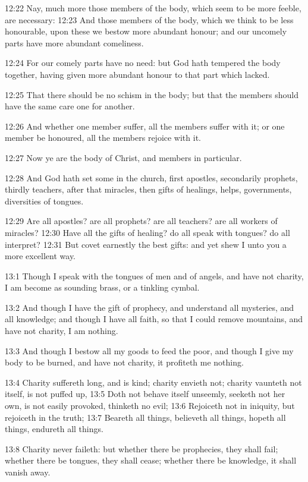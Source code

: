 12:22 Nay, much more those members of the body, which seem to be more feeble, are necessary: 12:23 And those members of the body, which we think to be less honourable, upon these we bestow more abundant honour; and our uncomely parts have more abundant comeliness.

12:24 For our comely parts have no need: but God hath tempered the body together, having given more abundant honour to that part which lacked.

12:25 That there should be no schism in the body; but that the members should have the same care one for another.

12:26 And whether one member suffer, all the members suffer with it; or one member be honoured, all the members rejoice with it.

12:27 Now ye are the body of Christ, and members in particular.

12:28 And God hath set some in the church, first apostles, secondarily prophets, thirdly teachers, after that miracles, then gifts of healings, helps, governments, diversities of tongues.

12:29 Are all apostles? are all prophets? are all teachers? are all workers of miracles?  12:30 Have all the gifts of healing? do all speak with tongues? do all interpret?  12:31 But covet earnestly the best gifts: and yet shew I unto you a more excellent way.

13:1 Though I speak with the tongues of men and of angels, and have not charity, I am become as sounding brass, or a tinkling cymbal.

13:2 And though I have the gift of prophecy, and understand all mysteries, and all knowledge; and though I have all faith, so that I could remove mountains, and have not charity, I am nothing.

13:3 And though I bestow all my goods to feed the poor, and though I give my body to be burned, and have not charity, it profiteth me nothing.

13:4 Charity suffereth long, and is kind; charity envieth not; charity vaunteth not itself, is not puffed up, 13:5 Doth not behave itself unseemly, seeketh not her own, is not easily provoked, thinketh no evil; 13:6 Rejoiceth not in iniquity, but rejoiceth in the truth; 13:7 Beareth all things, believeth all things, hopeth all things, endureth all things.

13:8 Charity never faileth: but whether there be prophecies, they shall fail; whether there be tongues, they shall cease; whether there be knowledge, it shall vanish away.

